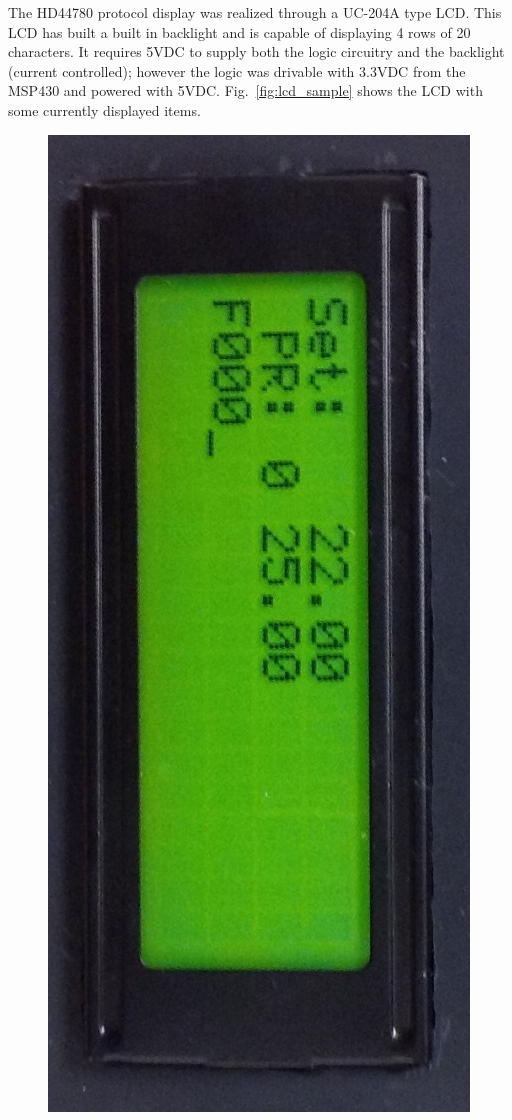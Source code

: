 The HD44780 protocol display was realized through a UC-204A type LCD.  This LCD has built a built in backlight and is capable of displaying 4 rows of 20 characters.  It requires 5VDC to supply both the logic circuitry and the backlight (current controlled); however the logic was drivable with 3.3VDC from the MSP430 and powered with 5VDC. Fig.~\ref{fig:lcd_sample} shows the LCD with some currently displayed items.

\begin{figure}
\centering
\includegraphics[width=.9\textwidth]{LCD_sample.jpg}

\end{figure}
